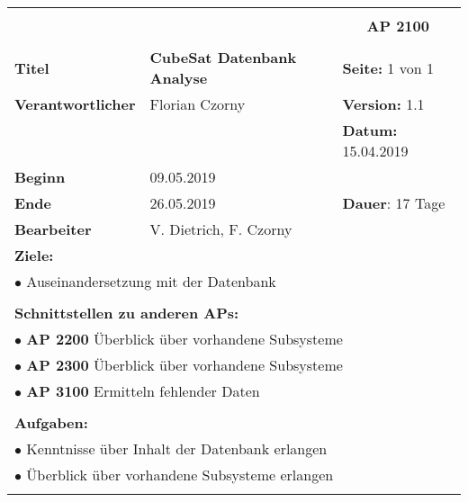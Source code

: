 \clearpage
\begin{table}[!h]
 \begin{center}
  \begin{tabular}{|p{35mm}||p{55mm}|p{50mm}||p{40mm}|}
   \hline
   \multicolumn{3}{|l||}{\textbf{}} & \multicolumn{1}{c|}{}\\
   \multicolumn{3}{|l||}{\textbf{}} & \multicolumn{1}{c|}{\textbf{AP 2100}}\\
   \multicolumn{3}{|l||}{\textbf{}} & \multicolumn{1}{c|}{}\\
   \hline\hline
   \textbf{Titel} & \multicolumn{2}{p{7cm}||}{\textbf{CubeSat Datenbank Analyse}} & \textbf{Seite:} 1 von 1\\
   \hline
   \textbf{Verantwortlicher} & \multicolumn{2}{l||}{Florian Czorny} & \textbf{Version:} 1.1\\
   \hline
   \multicolumn{3}{|l||}{} & \textbf{Datum:} 15.04.2019\\
   \hline\hline
   \textbf{Beginn} & \multicolumn{2}{l||}{09.05.2019} & \\
   \hline
   \textbf{Ende} & \multicolumn{2}{l||}{26.05.2019} & \textbf{Dauer}: 17 Tage\\
   \hline\hline
   \textbf{Bearbeiter} & \multicolumn{3}{l|}{V. Dietrich, F. Czorny}\\
   \hline\hline
   \multicolumn{4}{|p{150mm}|}{\textbf{Ziele:}}\\
   \multicolumn{4}{|p{150mm}|}{$\bullet$ Auseinandersetzung mit der Datenbank }\\
   \multicolumn{4}{|p{150mm}|}{}\\
   \multicolumn{4}{|p{150mm}|}{\textbf{Schnittstellen zu anderen APs:}}\\
   \multicolumn{4}{|p{150mm}|}{$\bullet$ \textbf{AP 2200} Überblick über vorhandene Subsysteme }\\
   \multicolumn{4}{|p{150mm}|}{$\bullet$ \textbf{AP 2300} Überblick über vorhandene Subsysteme }\\
	 \multicolumn{4}{|p{150mm}|}{$\bullet$ \textbf{AP 3100} Ermitteln fehlender Daten}\\
   \multicolumn{4}{|p{150mm}|}{}\\
   \multicolumn{4}{|p{150mm}|}{\textbf{Aufgaben:}}\\
   \multicolumn{4}{|p{150mm}|}{$\bullet$ Kenntnisse über Inhalt der Datenbank erlangen}\\
   \multicolumn{4}{|p{150mm}|}{$\bullet$ Überblick über vorhandene Subsysteme erlangen}\\
   \multicolumn{4}{|p{150mm}|}{}\\
   \hline
  \end{tabular}
 \end{center}
\end{table}

